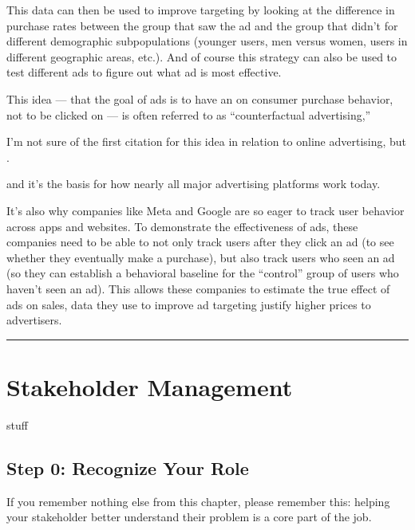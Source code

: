 \documentclass[letterpaper,10pt,english]{jupyterBook}
\begin{document}
\sphinxAtStartPar
This data can then be used to improve targeting by looking at the difference in purchase rates between the group that saw the ad and the group that didn’t for different demographic sub\sphinxhyphen{}populations (younger users, men versus women, users in different geographic areas, etc.). And of course this strategy can also be used to test different ads to figure out what ad is most effective.

\sphinxAtStartPar
This idea — that the goal of ads is to have an  on consumer purchase behavior, not to be clicked on — is often referred to as “counter\sphinxhyphen{}factual advertising,”%
\begin{footnote}[3]\sphinxAtStartFootnote
I’m not sure of the first citation for this idea in relation to online advertising, but .
%
\end{footnote} and it’s the basis for how nearly all major advertising platforms work today.

\sphinxAtStartPar
It’s also why companies like Meta and Google are so eager to track user behavior across apps and websites. To demonstrate the effectiveness of ads, these companies need to be able to not only track users after they click an ad (to see whether they eventually make a purchase), but also track users who  seen an ad (so they can establish a behavioral baseline for the “control” group of users who haven’t seen an ad). This allows these companies to estimate the true effect of ads on sales, data they use to improve ad targeting  justify higher prices to advertisers.




\bigskip\hrule\bigskip


\sphinxstepscope


\chapter{Stakeholder Management}
\label{\detokenize{20_problems_to_questions/20_stakeholder_management:stakeholder-management}}\label{\detokenize{20_problems_to_questions/20_stakeholder_management::doc}}
\sphinxAtStartPar
stuff


\section{Step 0: Recognize Your Role}
\label{\detokenize{20_problems_to_questions/20_stakeholder_management:step-0-recognize-your-role}}
\sphinxAtStartPar
If you remember nothing else from this chapter, please remember this: helping your stakeholder better understand their problem is a core part of the job.
\end{document}
